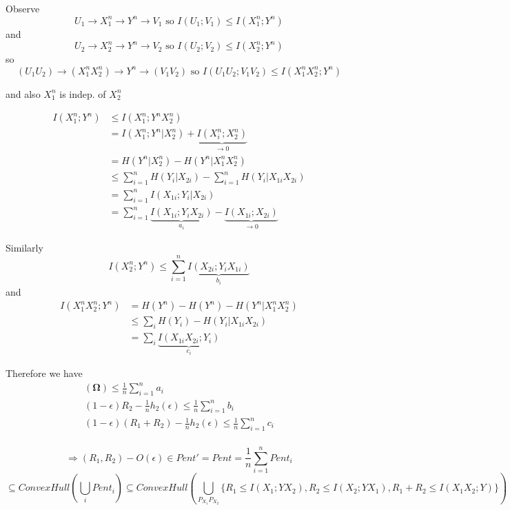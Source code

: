 \documentclass[twoside]{article}
\theoremstyle{definition} %
\begin{document}
Observe
\[
  U_1 \rightarrow X_1^n \rightarrow Y^n \rightarrow V_1 \text{ so } I(U_1 ; V_1) \leq I(X_1^n; Y^n)
\]
and
\[
  U_2 \rightarrow X_2^n \rightarrow Y^n \rightarrow V_2 \text{ so } I(U_2 ; V_2) \leq I(X_2^n; Y^n)
\]
so
\[
  (U_1 U_2) \rightarrow (X_1^n X_2^n) \rightarrow Y^n \rightarrow (V_1 V_2) \text{ so } I(U_1 U_2 ; V_1 V_2) \leq I(X_1^n X_2^n; Y^n)
\]

and also $X_1^n$ is indep. of $X_2^n$

\begin{align*}
  I(X_1^n ; Y^n) &\leq I(X_1^n ; Y^n X_2^n) \\
                 &= I(X_1^n ; Y^n | X_2^n) + \underbrace{I(X_i^n ; X_2^n)}_{\to 0} \\
                 &= H(Y^n | X_2^n) - H(Y^n | X_1^n X_2^n) \\
                 &\leq \sum_{i = 1}^n H(Y_i | X_{2i}) - \sum_{i = 1}^n H(Y_i | X_{1i} X_{2i}) \\
                 &= \sum_{i = 1}^n I(X_{1i} ; Y_i | X_{2i}) \\
                 &= \sum_{i = 1}^n \underbrace{I(X_{1i} ; Y_i X_{2i})}_{a_i} - \underbrace{I(X_{1i} ; X_{2i})}_{\to 0}
\end{align*}

Similarly
\[
  I(X_2^n ; Y^n) \leq \sum_{i = 1}^n \underbrace{I(X_{2i} ; Y_i X_{1i})}_{b_i}
\]
and
\begin{align*}
  I(X_1^n X_2^n ; Y^n) &= H(Y^n) - H(Y^n) - H(Y^n | X_1^n X_2^n ) \\
                       &\leq \sum_i H(Y_i) - H(Y_i | X_{1i} X_{2i}) \\
                       &= \sum_i \underbrace{I(X_{1i} X_{2i} ; Y_i)}_{c_i}
\end{align*}

Therefore we have
\begin{align*}
  \mathbf{(\Omega)} \leq \frac{1}{n} \sum_{i=1}^n a_i \\
  (1 - \epsilon) R_2 - \frac{1}{n} h_2(\epsilon) \leq \frac{1}{n} \sum_{i=1}^n b_i \\
  (1 - \epsilon) (R_1 + R_2) - \frac{1}{n} h_2(\epsilon) \leq \frac{1}{n} \sum_{i=1}^n c_i \\
\end{align*}

\[
  \Rightarrow (R_1, R_2) - O(\epsilon) \in Pent' = Pent = \frac{1}{n} \sum_{i=1}^n Pent_i
\]
\[
  \subseteq ConvexHull(\bigcup_i Pent_i) \subseteq ConvexHull(\bigcup_{P_{X_1} P_{X_2}} \{ R_1 \leq I(X_1 ; Y X_2),  R_2 \leq I(X_2 ; Y X_1),  R_1 + R_2 \leq I(X_1 X_2 ; Y)\})
\]
\end{document}
